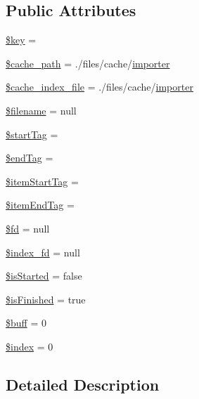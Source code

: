 \subsection*{Public Attributes}
\begin{DoxyCompactItemize}
\item 
\hyperlink{classextract_a894aac7e47b9ed0773922aa7eb9ce578}{\$key} = \textquotesingle{}\textquotesingle{}
\item 
\hyperlink{classextract_a00f1309c1e975d137a9f17ad9afc5d1e}{\$cache\+\_\+path} = \textquotesingle{}./files/cache/\hyperlink{classimporter}{importer}\textquotesingle{}
\item 
\hyperlink{classextract_a6bd40f89eeb4e608723a39f5824d0c1e}{\$cache\+\_\+index\+\_\+file} = \textquotesingle{}./files/cache/\hyperlink{classimporter}{importer}\textquotesingle{}
\item 
\hyperlink{classextract_abec232df6889e57dd327ddf132799f4c}{\$filename} = null
\item 
\hyperlink{classextract_a3acbe3af3d1b083b33023202a5e05432}{\$start\+Tag} = \textquotesingle{}\textquotesingle{}
\item 
\hyperlink{classextract_a46190b1f23addca9726e18aa15929c2a}{\$end\+Tag} = \textquotesingle{}\textquotesingle{}
\item 
\hyperlink{classextract_a11629128aedd1fc4b0a889640c693d0a}{\$item\+Start\+Tag} = \textquotesingle{}\textquotesingle{}
\item 
\hyperlink{classextract_abddb079afc9c7c2f210e7793b93388e5}{\$item\+End\+Tag} = \textquotesingle{}\textquotesingle{}
\item 
\hyperlink{classextract_ae21a224916b245a23dd69139f58c81ed}{\$fd} = null
\item 
\hyperlink{classextract_a6805ee81f498cae226d90b8fa9ecba88}{\$index\+\_\+fd} = null
\item 
\hyperlink{classextract_a609fc88642ae3bf1e27f0232f1b21171}{\$is\+Started} = false
\item 
\hyperlink{classextract_a0962c888279f7c5d551d3fdf1af1ee4c}{\$is\+Finished} = true
\item 
\hyperlink{classextract_a6f9b9ca9e370fe234587851838a368e7}{\$buff} = 0
\item 
\hyperlink{classextract_a167ca671b16d1b95eef76886f6d91a0c}{\$index} = 0
\end{DoxyCompactItemize}


\subsection{Detailed Description}


